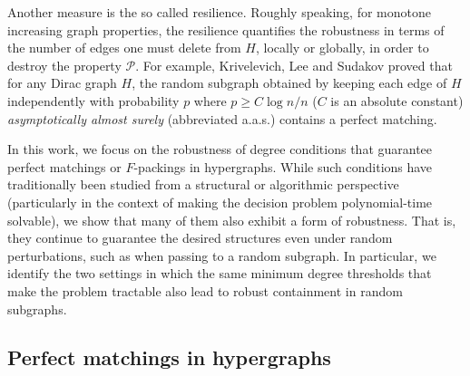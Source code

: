 \documentclass[11pt, letterpaper]{amsart}
\theoremstyle{plain}
\numberwithin{equation}{section}
\theoremstyle{definition}
\begin{document}

    

    Another measure is the so called resilience. 
    Roughly speaking, for monotone increasing graph properties, the resilience quantifies the robustness in terms of the number of edges one must delete from \(H\), locally or globally, in order to destroy the property \(\mathcal{P}\). 
    For example, Krivelevich, Lee and Sudakov \cite{krivelevich2014robust} proved that for any Dirac graph \(H\), the random subgraph obtained by keeping each edge of \(H\) independently with probability \(p\) where \( p\ge C \log n/n\) (\(C\) is an absolute constant) \emph{asymptotically almost surely} (abbreviated a.a.s.) contains a perfect matching.
    
    In this work, we focus on the robustness of degree conditions that guarantee perfect matchings or $F$-packings in hypergraphs. 
    While such conditions have traditionally been studied from a structural or algorithmic perspective (particularly in the context of making the decision problem polynomial-time solvable), we show that many of them also exhibit a form of robustness.
    That is, they continue to guarantee the desired structures even under random perturbations, such as when passing to a random subgraph.
    In particular, we identify the two settings in which the same minimum degree thresholds that make the problem tractable also lead to robust containment %
    in random subgraphs. 



    
    

    \subsection{Perfect matchings in hypergraphs}
\end{document}
